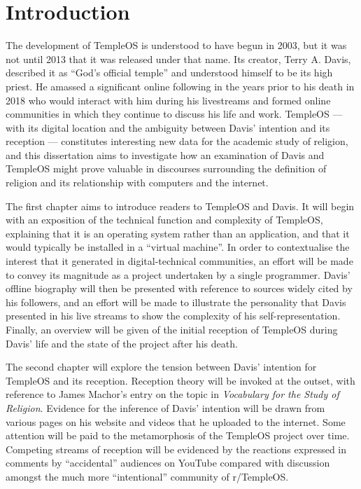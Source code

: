 \documentclass[Draft.tex]{subfiles}
\begin{document}
\chapter*{Introduction}

The development of TempleOS is understood to have begun in 2003,
but it was not until 2013 that it was released under that name.
Its creator, Terry A. Davis, described it as ``God's official temple''
and understood himself to be its high priest.
He amassed a significant online following
in the years prior to his death in 2018
who would interact with him during his livestreams
and formed online communities
in which they continue to discuss his life and work.
TempleOS --- with its digital location and the ambiguity between
Davis' intention and its reception --- constitutes interesting new data
for the academic study of religion,
and this dissertation aims to investigate how
an examination of Davis and TempleOS might prove valuable
in discourses surrounding the definition of religion
and its relationship with computers and the internet.

The first chapter aims to introduce readers to TempleOS and Davis.
It will begin with an exposition of the technical function
and complexity of TempleOS,
explaining that it is an operating system rather than an application,
and that it would typically be installed in a ``virtual machine''.
In order to contextualise the interest that it generated
in digital-technical communities, an effort will be made to convey
its magnitude as a project undertaken by a single programmer.
Davis' offline biography will then be presented
with reference to sources widely cited by his followers,
and an effort will be made to illustrate
the personality that Davis presented in his live streams
to show the complexity of his self-representation.
Finally, an overview will be given of the initial reception of TempleOS
during Davis' life and the state of the project after his death.

The second chapter will explore the tension between
Davis' intention for TempleOS and its reception.
Reception theory will be invoked at the outset,
with reference to James Machor's entry on the topic in
\textit{Vocabulary for the Study of Religion}.
Evidence for the inference of Davis' intention will be drawn from
various pages on his website and videos that he uploaded to the internet.
Some attention will be paid to
the metamorphosis of the TempleOS project over time.
Competing streams of reception will be evidenced
by the reactions expressed in comments by ``accidental'' audiences on YouTube
compared with discussion amongst the much more ``intentional''
community of r/TempleOS.
\end{document}
